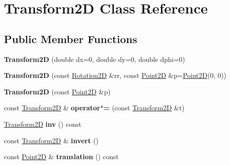 \hypertarget{classTransform2D}{}\section{Transform2D Class Reference}
\label{classTransform2D}
\subsection*{Public Member Functions}
\begin{DoxyCompactItemize}
\item 
\mbox{\label{classTransform2D_a5121f210c33849e1f5aaa476b51fac19}} 
{\bfseries Transform2D} (double dx=0, double dy=0, double dphi=0)
\item 
\mbox{\label{classTransform2D_a354ea82322ed73e7e5814c73c2acec01}} 
{\bfseries Transform2D} (const \hyperlink{classRotation2D}{Rotation2D} \&rr, const \hyperlink{classTVec2D}{Point2D} \&p=\hyperlink{classTVec2D}{Point2D}(0, 0))
\item 
\mbox{\label{classTransform2D_a2d4213898c0a438d9b263922ea4bf007}} 
{\bfseries Transform2D} (const \hyperlink{classTVec2D}{Point2D} \&p)
\item 
\mbox{\label{classTransform2D_ab127aa120542e0e96a1314329a2b6538}} 
const \hyperlink{classTransform2D}{Transform2D} \& {\bfseries operator$\ast$=} (const \hyperlink{classTransform2D}{Transform2D} \&t)
\item 
\mbox{\label{classTransform2D_af29b112b2321f8cc205e0d66b22e829b}} 
\hyperlink{classTransform2D}{Transform2D} {\bfseries inv} () const
\item 
\mbox{\label{classTransform2D_a6190d98204d6ac06759fb05679888ef7}} 
const \hyperlink{classTransform2D}{Transform2D} \& {\bfseries invert} ()
\item 
\mbox{\label{classTransform2D_ae3961fa462633c619a434056d4be31ee}} 
const \hyperlink{classTVec2D}{Point2D} \& {\bfseries translation} () const
\item 
\mbox{\label{classTransform2D_ac999a9ed1382c3b04e8261d0b822b3ee}} 

\end{DoxyCompactItemize}

